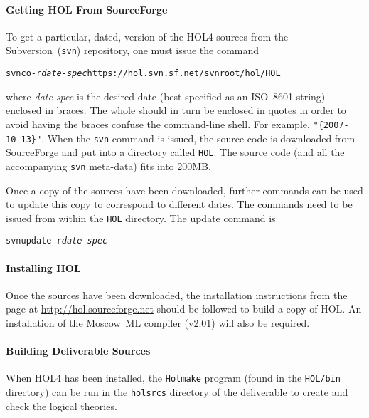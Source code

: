 \documentclass[11pt]{article}
\begin{document}
\paragraph{Getting HOL From SourceForge}

To get a particular, dated, version of the HOL4 sources from the
Subversion~(\texttt{svn}) repository, one must issue the command
\begin{alltt}
   svn co -r \textit{date-spec} https://hol.svn.sf.net/svnroot/hol/HOL
\end{alltt}
where \textit{\ttfamily date-spec} is the desired date (best specified
as an ISO~8601 string) enclosed in braces.  The whole should in turn
be enclosed in quotes in order to avoid having the braces confuse the
command-line shell.  For example, \texttt{"\{2007-10-13\}"}.  When the
\texttt{svn} command is issued, the source code is downloaded from
SourceForge and put into a directory called \texttt{HOL}.  The source
code (and all the accompanying \texttt{svn} meta-data) fits into
200MB.

Once a copy of the sources have been downloaded, further commands can
be used to update this copy to correspond to different dates.  The
commands need to be issued from within the \texttt{HOL} directory.
The update command is
\begin{alltt}
   svn update -r \textit{date-spec}
\end{alltt}

\paragraph{Installing HOL} Once the sources have been downloaded, the
installation instructions from the page at
\url{http://hol.sourceforge.net} should be followed to build a copy of
HOL.  An installation of the Moscow~ML compiler (v2.01) will also be
required.

\paragraph{Building Deliverable Sources}
When HOL4 has been installed, the \texttt{Holmake} program (found in
the \texttt{HOL/bin} directory) can be run in the \texttt{holsrcs}
directory of the \cpp{} deliverable to create and check the logical
theories.

\nocite{Stroustrup1994:DECPP,Stroustrup2000:TCPL,Paulson:ML,Gordon93}
\nocite{Rushby93}
\newpage



\printindex
\end{document}
